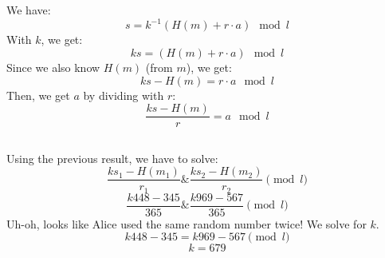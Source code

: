 \documentclass{article}
\begin{document}



\subsection{}
We have:
\[
s = k^{-1}(H(m)+r \cdot a) \mod l
\]
With $k$, we get:
\[
ks=(H(m)+r \cdot a) \mod l
\]
Since we also know $H(m)$ (from $m$), we get:
\[
ks-H(m)=r \cdot a \mod l
\]
Then, we get $a$ by dividing with $r$:
\[
\frac{ks-H(m)}{r}=a \mod l
\]

\subsection{}
Using the previous result, we have to solve:
\[
\frac{k s_1 - H(m_1)}{r_1}
\&
\frac{k s_2 - H(m_2)}{r_2}
\pmod l
\]
\[
\frac{k 448 - 345}{365}
\&
\frac{k 969 - 567}{365}
\pmod l
\]
Uh-oh, looks like Alice used the same random number twice!
We solve for $k$.
\[
k 448 - 345
=
k 969 - 567
\pmod l
\]
\[
k=679
\]
\end{document}
